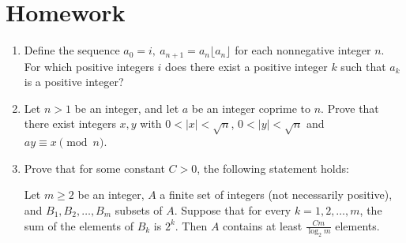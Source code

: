 \documentclass{article}
\begin{document}
\section{Homework}
  \begin{enumerate}
    \item Define the sequence $a_0=i,\ a_{n+1}=a_n\lfloor a_n\rfloor$ for each
      nonnegative integer $n$. For which positive integers $i$ does there exist a
      positive integer $k$ such that $a_k$ is a positive integer?
    \item Let $n>1$ be an integer, and let $a$ be an integer coprime to $n$. Prove
      that there exist integers $x,y$ with $0<|x|<\sqrt n$, $0<|y|<\sqrt n$ and
      $ay\equiv x\pmod n$.
    \item Prove that for some constant $C>0$, the following statement holds:

      Let $m\ge 2$ be an integer, $A$ a finite set of integers (not
      necessarily positive), and $B_1,B_2,\ldots,B_m$ subsets of $A$. Suppose
      that for every $k=1,2,\ldots,m$, the sum of the elements of $B_k$ is
      $2^k$. Then $A$ contains at least $\frac {Cm}{\log_2 m}$ elements.
  \end{enumerate}
\end{document}
